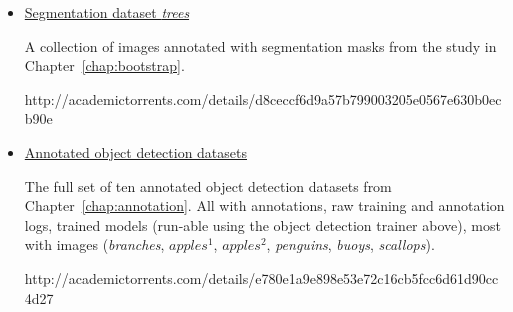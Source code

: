  \begin{itemize}
\item \href{http://academictorrents.com/details/d8ceccf6d9a57b799003205e0567e630b0ecb90e}{Segmentation dataset \emph{trees}} \par
A collection of images annotated with segmentation masks from the study in Chapter~\ref{chap:bootstrap}. \par\noindent http://academictorrents.com/details/d8ceccf6d9a57b799003205e0567e630b0ecb90e

\item \href{http://academictorrents.com/details/e780e1a9e898e53e72c16cb5fcc6d61d90cc4d27}{Annotated object detection datasets} \par
The full set of ten annotated object detection datasets from Chapter~\ref{chap:annotation}. All with annotations, raw training and annotation logs, trained models (run-able using the object detection trainer above), most with images (\emph{branches}, $apples^1$, $apples^2$, \emph{penguins}, \emph{buoys}, \emph{scallops}). \par\noindent
http://academictorrents.com/details/e780e1a9e898e53e72c16cb5fcc6d61d90cc4d27

\end{itemize}


